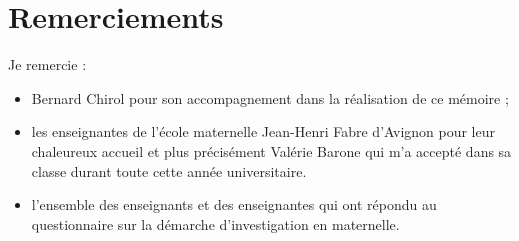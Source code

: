 \chapter*{Remerciements}
Je remercie :
\begin{itemize}
\item Bernard Chirol pour son accompagnement dans la réalisation de ce mémoire ;
\item les enseignantes de l’école maternelle Jean-Henri Fabre d’Avignon pour leur chaleureux accueil et plus précisément Valérie Barone qui m’a accepté dans sa classe durant toute cette année universitaire.
\item l’ensemble des enseignants et des enseignantes qui ont répondu au questionnaire sur la démarche d’investigation en maternelle.
\end{itemize}